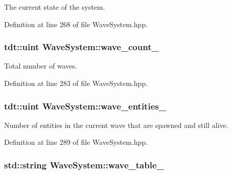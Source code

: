 The current state of the system. 



Definition at line 268 of file Wave\+System.\+hpp.

\subsubsection[{\texorpdfstring{wave\+\_\+count\+\_\+}{wave_count_}}]{\setlength{\rightskip}{0pt plus 5cm}tdt\+::uint Wave\+System\+::wave\+\_\+count\+\_\+\hspace{0.3cm}{\ttfamily [private]}}\hypertarget{class_wave_system_af0ea0ae6d2397d9cb0d69cd19eca3177}{}\label{class_wave_system_af0ea0ae6d2397d9cb0d69cd19eca3177}


Total number of waves. 



Definition at line 283 of file Wave\+System.\+hpp.

\subsubsection[{\texorpdfstring{wave\+\_\+entities\+\_\+}{wave_entities_}}]{\setlength{\rightskip}{0pt plus 5cm}tdt\+::uint Wave\+System\+::wave\+\_\+entities\+\_\+\hspace{0.3cm}{\ttfamily [private]}}\hypertarget{class_wave_system_a378035c7325464436bce4235678dfe42}{}\label{class_wave_system_a378035c7325464436bce4235678dfe42}


Number of entities in the current wave that are spawned and still alive. 



Definition at line 289 of file Wave\+System.\+hpp.

\subsubsection[{\texorpdfstring{wave\+\_\+table\+\_\+}{wave_table_}}]{\setlength{\rightskip}{0pt plus 5cm}std\+::string Wave\+System\+::wave\+\_\+table\+\_\+\hspace{0.3cm}{\ttfamily [private]}}\hypertarget{class_wave_system_a98c198bf1c005e3861c22c28eee0f791}{}\label{class_wave_system_a98c198bf1c005e3861c22c28eee0f791}


